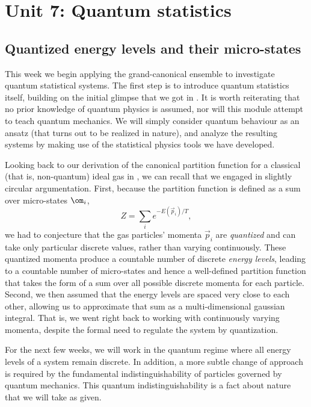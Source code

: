 \renewcommand{\thisunit}{MATH327 Unit 7}
\renewcommand{\moddate}{Last modified 6 Mar.~2022}
\setcounter{section}{7}
\setcounter{subsection}{0}
{}
\section*{Unit 7: Quantum statistics}
\subsection{\label{sec:quantum}Quantized energy levels and their micro-states}
This week we begin applying the grand-canonical ensemble to investigate quantum statistical systems.
The first step is to introduce quantum statistics itself, building on the initial glimpse that we got in .
It is worth reiterating that no prior knowledge of quantum physics is assumed, nor will this module attempt to teach quantum mechanics.
We will simply consider quantum behaviour as an ansatz (that turns out to be realized in nature), and analyze the resulting systems by making use of the statistical physics tools we have developed.

Looking back to our derivation of the canonical partition function for a classical (that is, non-quantum) ideal gas in , we can recall that we engaged in slightly circular argumentation.
First, because the partition function is defined as a sum over micro-states $\om_i$,
\begin{equation*}
  Z = \sum_i e^{-E(\vec{p}_i) / T},
\end{equation*}
we had to conjecture that the gas particles' momenta $\vec{p}_i$ are \textit{quantized} and can take only particular discrete values, rather than varying continuously.
These quantized momenta produce a countable number of discrete \textit{energy levels}, leading to a countable number of micro-states and hence a well-defined partition function that takes the form of a sum over all possible discrete momenta for each particle.
Second, we then assumed that the energy levels are spaced very close to each other, allowing us to approximate that sum as a multi-dimensional gaussian integral.
That is, we went right back to working with continuously varying momenta, despite the formal need to regulate the system by quantization.

For the next few weeks, we will work in the quantum regime where all energy levels of a system remain discrete.
In addition, a more subtle change of approach is required by the fundamental indistinguishability of particles governed by quantum mechanics.
This quantum indistinguishability is a fact about nature that we will take as given.

